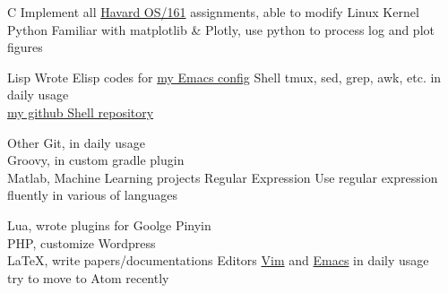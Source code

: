 \cvcomputer
{C}{
  Implement all \href{http://www.eecs.harvard.edu/~syrah/os161/}{Havard OS/161} assignments,
  able to modify Linux Kernel
}
{Python}{
  Familiar with matplotlib \& Plotly, use python to process log and plot figures
}

\cvcomputer
{Lisp}{
  Wrote Elisp codes for \href{https://github.com/xcv58/Emacs_config}{my Emacs config}
}
{Shell}{
  tmux, sed, grep, awk, etc. in daily usage\\
  \href{https://github.com/xcv58/Shell_script}{my github Shell repository}
}

\cvcomputer
{Other}{
  Git, in daily usage\\
  Groovy, in custom gradle plugin\\
  Matlab, Machine Learning projects
}
{Regular Expression}{
  Use regular expression fluently in various of languages
}

\cvcomputer
{}{
  Lua, wrote plugins for Goolge Pinyin\\
  PHP, customize Wordpress\\
  {\LaTeX}, write papers/documentations
}
{Editors}{
  \href{https://github.com/xcv58/Vim_config}{Vim} and
  \href{https://github.com/xcv58/Emacs_config}{Emacs} in daily usage\\
  try to move to Atom recently
}
